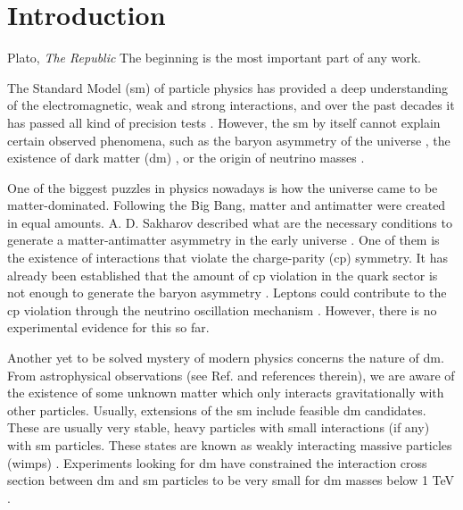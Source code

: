 \chapter{Introduction}
\label{chapter:introduction}


\begin{chapquote}{Plato, \textit{The Republic}}
	The beginning is the most important part of any work.
\end{chapquote}

The Standard Model (\gls{sm}) of particle physics \cite{Glashow1961,Weinberg1967,Salam1968} has provided a deep understanding of the electromagnetic, weak and strong interactions, and over the past decades it has passed all kind of precision tests \cite{Erler2019}. However, the \gls{sm} by itself cannot explain certain observed phenomena, such as the baryon asymmetry of the universe \cite{Canetti2012}, the existence of dark matter (\gls{dm}) \cite{Bertone2004}, or the origin of neutrino masses \cite{King2014}.

One of the biggest puzzles in physics nowadays is how the universe came to be matter-dominated. Following the Big Bang, matter and antimatter were created in equal amounts. A. D. Sakharov described what are the necessary conditions to generate a matter-antimatter asymmetry in the early universe \cite{Sakharov1967}. One of them is the existence of interactions that violate the charge-parity (\gls{cp}) symmetry. It has already been established that the amount of \gls{cp} violation in the quark sector is not enough to generate the baryon asymmetry \cite{Gavela1993}. Leptons could contribute to the \gls{cp} violation through the neutrino oscillation mechanism \cite{Akhmedov1998}. However, there is no experimental evidence for this so far.

Another yet to be solved mystery of modern physics concerns the nature of \gls{dm}. From astrophysical observations (see Ref. \cite{Bertone2004} and references therein), we are aware of the existence of some unknown matter which only interacts gravitationally with other particles. Usually, extensions of the \gls{sm} include feasible \gls{dm} candidates. These are usually very stable, heavy particles with small interactions (if any) with \gls{sm} particles. These states are known as weakly interacting massive particles (\gls{wimp}s) \cite{Lee1977,Jungman1995}. Experiments looking for \gls{dm} have constrained the interaction cross section between \gls{dm} and \gls{sm} particles to be very small for \gls{dm} masses below 1 TeV \cite{Arcadi2024}.

